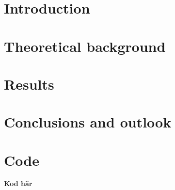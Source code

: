 \documentclass[a4paper, 12pt]{article}
\newcommand{\note}[1]{{\color{red}\textbf{#1} } }
\begin{document}

\section{Introduction}


\newpage

\section{Theoretical background}


\newpage
\section{Results}

\newpage
\section{Conclusions and outlook}



\newpage


\newpage

\appendix

\section{Code}
\note{Kod här}
\end{document}
